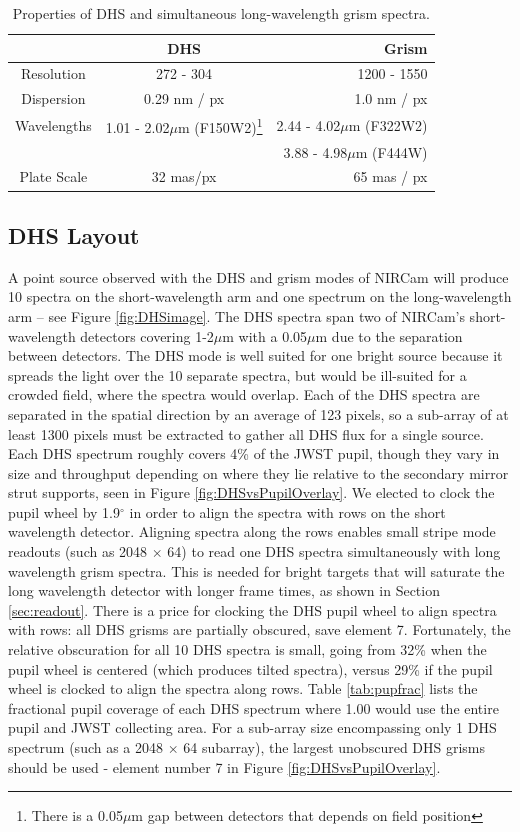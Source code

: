 \documentclass[iop]{emulateapj}
\newcommand{\DHSres}{272 - 304}
\begin{document}
\begin{table}
\centering
\begin{tabular}{ccr}
		& DHS	& Grism \\
 \hline \hline		
Resolution &  \DHSres & 1200 - 1550 \\
Dispersion & 0.29 nm / px & 1.0 nm / px \\
Wavelengths & 1.01 - 2.02$\mu$m (F150W2)\footnote{There is a 0.05$\mu$m gap between detectors that depends on field position} & 2.44 - 4.02$\mu$m (F322W2)\\
				& 								& 3.88 - 4.98$\mu$m (F444W) \\
Plate Scale & 32 mas/px  &  65 mas / px\\
\hline
\end{tabular}
\caption{Properties of DHS and simultaneous long-wavelength grism spectra.}\label{tab:DHSgprop}
\vspace{0.1in}
\end{table}

\subsection{DHS Layout}

A point source observed with the DHS and grism modes of NIRCam will produce 10 spectra on the short-wavelength arm and one spectrum on the long-wavelength arm -- see Figure \ref{fig:DHSimage}.
The DHS spectra span two of NIRCam's short-wavelength detectors covering 1-2$\mu$m with a 0.05$\mu$m due to the separation between detectors.
The DHS mode is well suited for one bright source because it spreads the light over the 10 separate spectra, but would be ill-suited for a crowded field, where the spectra would overlap.
Each of the DHS spectra are separated in the spatial direction by an average of 123 pixels, so a sub-array of at least 1300 pixels must be extracted to gather all DHS flux for a single source.
Each DHS spectrum roughly covers 4\% of the JWST pupil, though they vary in size and throughput depending on where they lie relative to the secondary mirror strut supports, seen in Figure \ref{fig:DHSvsPupilOverlay}.
We elected to clock the pupil wheel by 1.9$^\circ$ in order to align the spectra with rows on the short wavelength detector.
Aligning spectra along the rows enables small stripe mode readouts (such as 2048 $\times$ 64) to read one DHS spectra simultaneously with long wavelength grism spectra.
This is needed for bright targets that will saturate the long wavelength detector with longer frame times, as shown in Section \ref{sec:readout}.
There is a price for clocking the DHS pupil wheel to align spectra with rows: all DHS grisms are partially obscured, save element 7.
Fortunately, the relative obscuration for all 10 DHS spectra is small, going from 32\% when the pupil wheel is centered (which produces tilted spectra), versus 29\% if the pupil wheel is clocked to align the spectra along rows.
Table \ref{tab:pupfrac} lists the fractional pupil coverage of each DHS spectrum where 1.00 would use the entire pupil and JWST collecting area.
For a sub-array size encompassing only 1 DHS spectrum (such as a 2048 $\times$ 64 subarray), the largest unobscured DHS grisms should be used - element number 7 in Figure \ref{fig:DHSvsPupilOverlay}.
\end{document}
